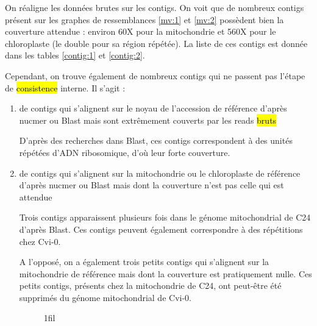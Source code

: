 \documentclass[a4paper]{article}
\makeatletter
\newcommand{\rewrite}[1]{\todo[color=green!40]{#1}}
\newcommand{\hlrewrite}[2]{\sethlcolor{green} \hl{#1} \rewrite{#2}}
\newcommand*{\centerfloat}{%
  \parindent \z@
  \leftskip \z@ \@plus 1fil \@minus \textwidth
  \rightskip\leftskip
  \parfillskip \z@skip}
\makeatother
\begin{document}
On réaligne les données brutes sur les contigs. On voit que de nombreux contigs présent sur les graphes de ressemblances \ref{mv:1} et \ref{mv:2} possèdent bien la couverture attendue : environ 60X pour la mitochondrie et 560X pour le chloroplaste (le double pour sa région répétée). La liste de ces contigs est donnée dans les tables \ref{contig:1} et \ref{contig:2}. 

Cependant, on trouve également de nombreux contigs qui ne passent pas l'étape de \hlrewrite{consistence}{consistance} interne. Il s'agit : 
\begin{enumerate}
	\item de contigs qui s'alignent sur le noyau de l'accession de référence d'après nucmer ou Blast mais sont extrêmement couverts par les reads \hlrewrite{bruts}{brutes} 

D'après des recherches dans Blast, ces contigs correspondent à des unités répétées d'ADN ribosomique, d'où leur forte couverture.

\item de contigs qui s'alignent sur la mitochondrie ou le chloroplaste de référence d'après nucmer ou Blast mais dont la couverture n'est pas celle qui est attendue

Trois contigs apparaissent plusieurs fois dans le génome mitochondrial de C24 d'après Blast. Ces contigs peuvent également correspondre à des répétitions chez Cvi-0. 

A l'opposé, on a également trois petits contigs qui s'alignent sur la mitochondrie de référence mais dont la couverture est pratiquement nulle. Ces petits contigs, présents chez la mitochondrie de C24, ont peut-être été supprimés du génome mitochondrial de Cvi-0.

\begin{figure}[!ht]
\centerfloat

 \hspace{5mm}
\end{figure}
\end{enumerate}
\end{document}
